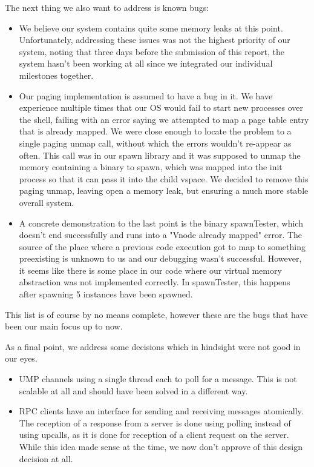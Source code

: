 The next thing we also want to address is known bugs:
\begin{itemize}
\item  We believe our system contains quite some memory leaks at this point. Unfortunately, addressing these issues was not the highest priority of our system, noting that three days before the submission of this report, the system hasn't been working at all since we integrated our individual milestones together.
\item Our paging implementation is assumed to have a bug in it. We have experience multiple times that our OS would fail to start 
new processes over the shell, failing with an error saying we attempted to map a page table entry that is already mapped. We were close enough
to locate the problem to a single paging unmap call, without which the errors wouldn't re-appear as often. This call was in our spawn library and
it was supposed to unmap the memory containing a binary to spawn, which was mapped into the init process so that it can 
pass it into the child vspace. We decided to remove this paging unmap, leaving open a memory leak, but ensuring a much more stable overall system.
\item A  concrete demonstration to the last point is the binary spawnTester, which doesn't end successfully and runs into a 
"Vnode already mapped" error. The source of the place where a previous code execution got to map to something preexisting is unknown to us and our debugging
wasn't successful. However, it seems like there is some place in our code where our virtual memory abstraction was not implemented correctly. In spawnTester,
this happens after spawning 5 instances have been spawned. 
\end{itemize}

This list is of course by no means complete, however these are the bugs that have been our main focus up to now.

As a final point, we address some decisions which in hindsight were not good in our eyes.
\begin{itemize}
    \item UMP channels using a single thread each to poll for a message. This is not scalable at all and should have been solved in a 
    different way.
    \item RPC clients have an interface for sending and receiving messages atomically. The reception of a response from a server
    is done using polling instead of using upcalls, as it is done for reception of a client request on the server. While this idea
    made sense at the time, we now don't approve of this design decision at all.
\end{itemize}

